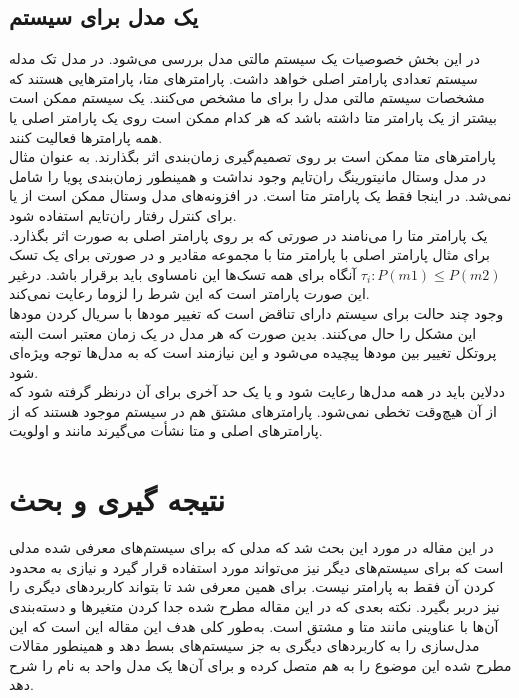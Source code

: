 \documentclass[a4paper, 11pt]{article}
\begin{document}
\subsection{یک مدل برای سیستم}
در این بخش خصوصیات یک سیستم مالتی مدل بررسی می‌شود. در مدل تک مدله سیستم تعدادی پارامتر
اصلی خواهد داشت. پارامتر‌های متا، پارامتر‌هایی هستند که مشخصات سیستم مالتی مدل را برای ما
مشخص می‌کنند. یک سیستم ممکن است بیشتر از یک پارامتر متا داشته باشد که هر کدام ممکن است
روی یک پارامتر اصلی یا همه پارامتر‌ها فعالیت کنند. \\
پارامتر‌های متا ممکن است بر روی تصمیم‌گیری زمان‌بندی اثر بگذارند. به عنوان مثال در مدل وستال
مانیتورینگ ران‌تایم وجود نداشت و همینطور زمان‌بندی پویا را شامل نمی‌شد.
در اینجا
فقط یک پارامتر متا است. در افزونه‌های مدل وستال ممکن است از
یا
برای کنترل رفتار ران‌تایم استفاده شود. \\
یک پارامتر متا را
می‌نامند در صورتی که بر روی پارامتر اصلی به صورت
اثر بگذارد. برای مثال پارامتر اصلی
با پارامتر متا
با مجموعه مقادیر
و
در صورتی برای یک تسک
$\tau_i: P(m1) \le P(m2)$
آنگاه برای همه تسک‌ها این نامساوی باید برقرار باشد. درغیر این صورت پارامتر
است که این شرط را لزوما رعایت نمی‌کند. \\
وجود چند حالت برای سیستم دارای تناقض است که تغییر مود‌ها با سریال کردن مود‌ها این مشکل را حال
می‌کنند. بدین صورت که هر مدل در یک زمان معتبر است البته پروتکل تغییر بین مود‌ها پیچیده می‌شود
و این نیازمند است که به مدل‌ها توجه ویژه‌ای شود. \\
ددلاین باید در همه مدل‌ها رعایت شود و یا یک حد آخری برای آن درنظر گرفته شود که از آن هیچ‌وقت
تخطی نمی‌شود.
پارامتر‌های مشتق هم در سیستم موجود هستند که از پارامتر‌های اصلی و متا نشأت می‌گیرند مانند
و اولویت.
\section{نتیجه گیری و بحث}
در این مقاله در مورد این بحث شد که مدلی که برای سیستم‌های
معرفی شده مدلی است که برای سیستم‌های دیگر نیز می‌تواند مورد استفاده قرار گیرد و نیازی
به محدود کردن آن فقط به پارامتر
نیست. برای همین
معرفی شد تا بتواند کاربرد‌های دیگری را نیز دربر بگیرد.
نکته بعدی که در این مقاله مطرح شده جدا کردن متغیر‌ها و دسته‌بندی آن‌ها با عناوینی مانند متا و مشتق
است. به‌طور کلی هدف این مقاله این است که این مدل‌سازی را به کاربرد‌های دیگری
به جز سیستم‌های
بسط دهد و همینطور مقالات مطرح شده این موضوع را به هم متصل کرده و برای آن‌ها یک مدل
واحد به نام
را شرح دهد.



\end{document}
